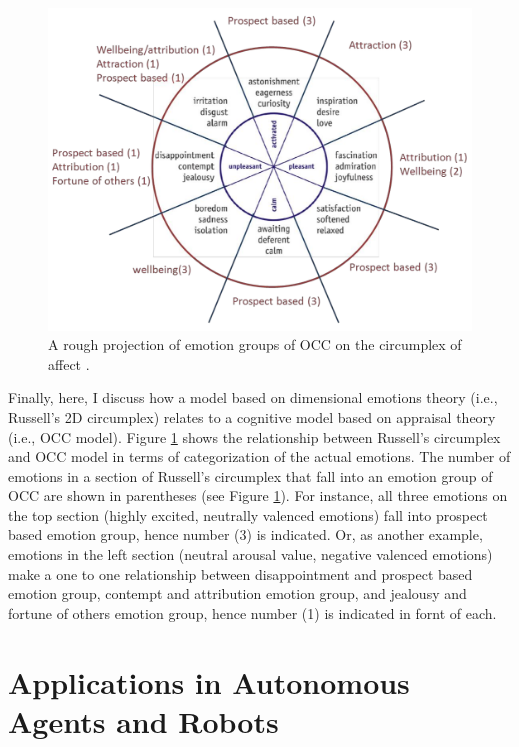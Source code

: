 \documentclass[11pt]{article}
\begin{document}
\begin{figure}[tbh]
  \center
  \includegraphics[width=.9\textwidth]{figure/occ-circumplex-mapping.png}
  \caption{A rough projection of emotion groups of OCC on the circumplex of
  affect \cite{ahmadpour:occ-dimensional-comparison}.}
  \label{fig:occ-circumplex}
\end{figure}

Finally, here, I discuss how a model based on dimensional emotions theory
(i.e., Russell's 2D circumplex) relates to a cognitive model based on appraisal
theory (i.e., OCC model). Figure \ref{fig:occ-circumplex} shows the relationship
between Russell's circumplex and OCC model in terms of categorization of the
actual emotions. The number of emotions in a section of Russell's circumplex
that fall into an emotion group of OCC are shown in parentheses (see Figure
\ref{fig:occ-circumplex}). For instance, all three emotions on the top section
(highly excited, neutrally valenced emotions) fall into prospect based emotion
group, hence number (3) is indicated. Or, as another example, emotions in the
left section (neutral arousal value, negative valenced emotions) make a one to
one relationship between disappointment and prospect based emotion group,
contempt and attribution emotion group, and jealousy and fortune of others
emotion group, hence number (1) is indicated in fornt of each.

\section{Applications in Autonomous Agents and Robots}
\label{sec:applications}
\end{document}
